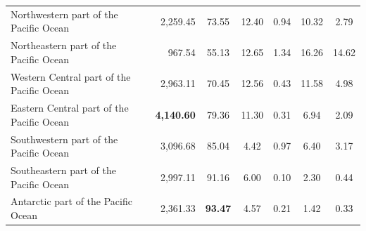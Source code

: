 \documentclass[12pt,authoryear]{elsarticle}
\begin{document}
\begin{table}[h]
{\begin{tabular}{ l r  c  c   c  c c }
Northwestern part of the Pacific Ocean     &  2,259.45 & 73.55 & 12.40 &  0.94 & 10.32 &  2.79 \\ 
Northeastern part of the Pacific Ocean     &    967.54 & 55.13 & 12.65 &  1.34 & 16.26 & 14.62 \\ 
Western Central part of the Pacific Ocean  &  2,963.11 & 70.45 & 12.56 &  0.43 & 11.58 &  4.98 \\ 
Eastern Central part of the Pacific Ocean  & \textbf{4,140.60} & 79.36 & 11.30 &  0.31 &  6.94 &  2.09 \\ 
Southwestern part of the Pacific Ocean     &  3,096.68 & 85.04 &  4.42 &  0.97 &  6.40 &  3.17 \\ 
Southeastern part of the Pacific Ocean     &  2,997.11 & 91.16 &  6.00 &  0.10 &  2.30 &  0.44 \\ 
Antarctic part of the Pacific Ocean        &  2,361.33 & \textbf{93.47} & 4.57 &  0.21 &  1.42 &  0.33 \\ 
  \hline
   \hline
\end{tabular}
}
\end{table}
\end{document}
